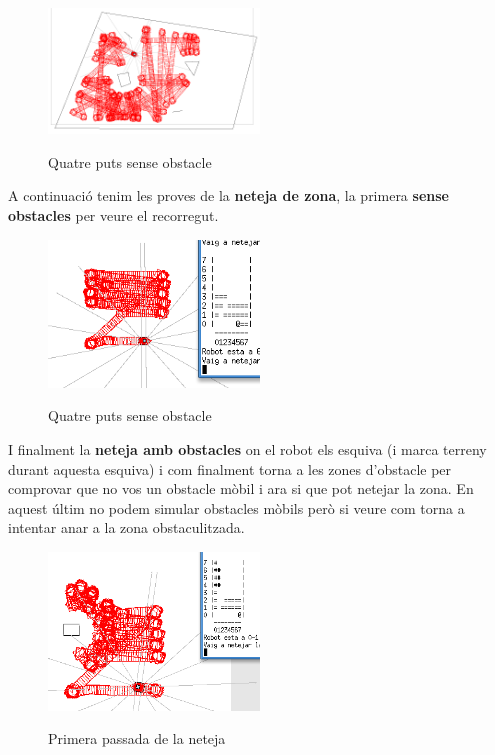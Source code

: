 \begin{figure}[H]
\begin{center}\label{vagant}
 \includegraphics[width=0.5\textwidth]{diagrames/figures/vagant.png}
\end{center}
  \caption{Quatre puts sense obstacle}
\end{figure}

A continuació tenim les proves de la \textbf{neteja de zona}, la primera \textbf{sense obstacles} per veure el recorregut.

\begin{figure}[H]
\begin{center}\label{neteja}
 \includegraphics[width=0.5\textwidth]{diagrames/figures/netNoObs.png}
\end{center}
  \caption{Quatre puts sense obstacle}
\end{figure}


I finalment la \textbf{neteja amb obstacles} on el robot els esquiva (i marca terreny durant aquesta esquiva)
i com finalment torna a les zones d'obstacle per comprovar que no vos un obstacle mòbil i ara si que
pot netejar la zona. En aquest últim no podem simular obstacles mòbils però si veure com torna a intentar
anar a la zona obstaculitzada.

\begin{figure}[H]
\begin{center}\label{netejaobs}
 \includegraphics[width=0.5\textwidth]{diagrames/figures/netejant.png}
\end{center}
  \caption{Primera passada de la neteja}
\end{figure}

